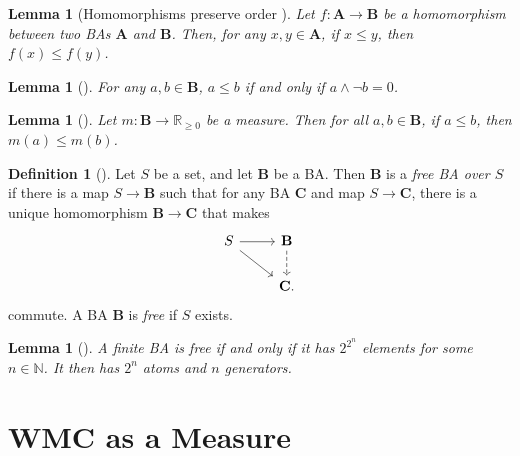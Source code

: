 \documentclass{article}
\newtheorem{lemma}[theorem]{Lemma}
\theoremstyle{definition}
\newtheorem{definition}[theorem]{Definition}
\theoremstyle{remark}
\begin{document}
\begin{lemma}[Homomorphisms preserve order
  \cite{givant2008introduction}] \label{lemma:homomorphisms_and_order}
  Let $f\colon \mathbf{A} \to \mathbf{B}$ be a homomorphism between two BAs
  $\mathbf{A}$ and $\mathbf{B}$. Then, for any $x, y \in \mathbf{A}$, if $x \le
  y$, then $f(x) \le f(y)$.
\end{lemma}

\begin{lemma}[\cite{sikorski1969boolean}] \label{lemma:order}
  For any $a, b \in \mathbf{B}$, $a \le b$ if and only if $a \land \neg b = 0$.
\end{lemma}

\begin{lemma}[\cite{givant2008introduction}] \label{lemma:measure_and_order}
  Let $m\colon \mathbf{B} \to \mathbb{R}_{\ge 0}$ be a measure. Then for all $a,
  b \in \mathbf{B}$, if $a \le b$, then $m(a) \le m(b)$.
\end{lemma}

\begin{definition}[\cite{koppelberg1989handbook}]
  Let $S$ be a set, and let $\mathbf{B}$ be a BA. Then $\mathbf{B}$ is a
  \emph{free BA over $S$} if there is a map $S \to \mathbf{B}$ such that for any
  BA $\mathbf{C}$ and map $S \to \mathbf{C}$, there is a unique homomorphism
  $\mathbf{B} \to \mathbf{C}$ that makes
  \[
    \begin{tikzcd}
      S \ar[rd] \ar[r] & \mathbf{B} \ar[d,dashed] \\
      & \mathbf{C}.
    \end{tikzcd}
  \]
  commute. A BA $\mathbf{B}$ is \emph{free} if $S$ exists.
\end{definition}

\begin{lemma}[\cite{sikorski1969boolean}] \label{lemma:finite_and_free}
  A finite BA is free if and only if it has $2^{2^n}$ elements for some $n \in
  \mathbb{N}$. It then has $2^n$ atoms and $n$ generators.
\end{lemma}

\section{WMC as a Measure}
\end{document}
